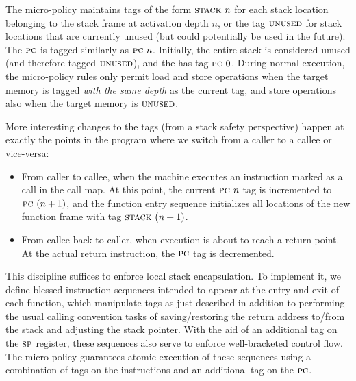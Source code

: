 \documentclass[acmsmall,review,anonymous]{acmart}\settopmatter{printfolios=true,printccs=false,printacmref=false}
\begin{document}
{The micro-policy maintains tags of the form $\textsc{stack} ~ n$ for
each stack location belonging to the stack frame at activation depth
$n$, or the tag $\textsc{unused}$ for stack locations that are currently
unused (but could potentially be used in the future).
%
The $\textsc{pc}$ is tagged similarly as $\textsc{pc} ~ n$.
%
Initially, the entire stack is considered unused (and therefore tagged
$\textsc{unused}$), and the {\PCname} has tag $\textsc{pc} ~ 0$.
%
During normal execution, the micro-policy rules only permit load and
store operations when the target memory is tagged {\em with the same
  depth} as the current {\PCname} tag, and store operations also when the
target memory is $\textsc{unused}$.


More interesting changes to the tags (from a stack safety perspective)
happen at exactly the points in the program where we switch from a
caller to a callee or vice-versa:

\begin{itemize}

\item From caller to callee, when the machine executes an instruction marked as a call in
  the call map.
  At this point, the current
  $\textsc{pc} ~ n$ tag is incremented to $\textsc{pc} ~ (n + 1)$, and the function
  entry sequence initializes  all locations of the new function frame with
  tag $\textsc{stack} ~ (n + 1)$.

\item From callee back to caller, when execution is about to reach a
  return point.
  At the actual return instruction,
  the $\textsc{pc}$ tag is decremented.

\end{itemize}

This discipline suffices to enforce local stack encapsulation.
To implement it,  we define blessed instruction sequences
intended to appear at the entry and exit of each function,
which manipulate tags as just described in addition to performing the
usual calling convention tasks of saving/restoring the return address to/from
the stack and adjusting the stack pointer. With the aid of an additional tag on
the $\textsc{sp}$ register, these sequences also serve to enforce
well-bracketed control flow.
The micro-policy guarantees atomic execution of these sequences
using a combination of tags on the instructions
and an additional tag on the $\textsc{pc}$.

}
\end{document}
